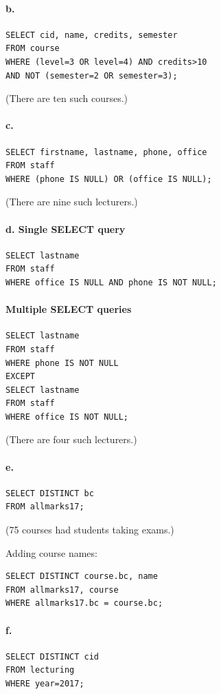 \paragraph{b.}
\begin{verbatim}
SELECT cid, name, credits, semester
FROM course
WHERE (level=3 OR level=4) AND credits>10
AND NOT (semester=2 OR semester=3);
\end{verbatim}
(There are ten such courses.)

\paragraph{c.}
\begin{verbatim}
SELECT firstname, lastname, phone, office
FROM staff
WHERE (phone IS NULL) OR (office IS NULL);
\end{verbatim}
(There are nine such lecturers.)

\paragraph{d. Single SELECT query}
\begin{verbatim}
SELECT lastname
FROM staff
WHERE office IS NULL AND phone IS NOT NULL;
\end{verbatim}

\paragraph{Multiple SELECT queries}
\begin{verbatim}
SELECT lastname
FROM staff
WHERE phone IS NOT NULL
EXCEPT
SELECT lastname
FROM staff
WHERE office IS NOT NULL;
\end{verbatim}
(There are four such lecturers.)

\paragraph{e.}
\begin{verbatim}
SELECT DISTINCT bc
FROM allmarks17;
\end{verbatim}
(75 courses had students taking exams.)

Adding course names:
\begin{verbatim}
SELECT DISTINCT course.bc, name
FROM allmarks17, course
WHERE allmarks17.bc = course.bc;
\end{verbatim}

\paragraph{f.}
\begin{verbatim}
SELECT DISTINCT cid
FROM lecturing
WHERE year=2017;
\end{verbatim}

